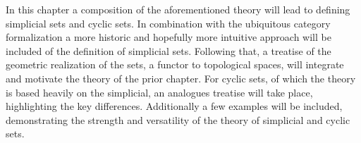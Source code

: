 \documentclass[../../main.tex]{subfiles}
\begin{document}
    In this chapter a composition of the aforementioned theory will lead to defining simplicial sets and cyclic sets. In combination with the ubiquitous category formalization a more historic and hopefully more intuitive approach will be included of the definition of simplicial sets. Following that, a treatise of the geometric realization of the sets, a functor to topological spaces, will integrate and motivate the theory of the prior chapter. For cyclic sets, of which the theory is based heavily on the simplicial, an analogues treatise will take place, highlighting the key differences. Additionally a few examples will be included, demonstrating the strength and versatility of the theory of simplicial and cyclic sets.
\end{document}
